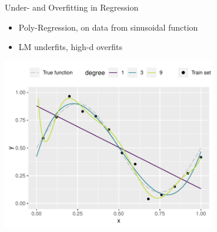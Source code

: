 \begin{vbframe}{Under- and Overfitting in Regression}
\begin{itemize}
\item Poly-Regression, on data from sinusoidal function
\item LM underfits, high-d overfits
\end{itemize}
\begin{center}
\includegraphics[width=0.7\textwidth]{figure/eval_train_2} 
\end{center}
\end{vbframe}


